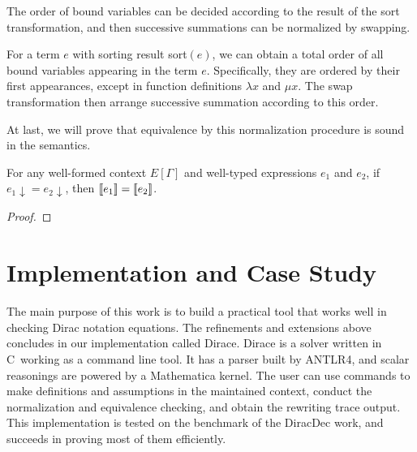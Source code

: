 \documentclass[runningheads]{llncs}
\newcommand{\CC}{C\nolinebreak\hspace{-.05em}\raisebox{.4ex}{\tiny\bf +}\nolinebreak\hspace{-.10em}\raisebox{.4ex}{\tiny\bf +}}
\def\CC{{C\nolinebreak[4]\hspace{-.05em}\raisebox{.4ex}{\tiny\bf ++}}}
\begin{document}
The order of bound variables can be decided according to the result of the sort transformation, and then successive summations can be normalized by swapping.
\begin{definition}
    For a term $e$ with sorting result sort$(e)$, we can obtain a total order of all bound variables appearing in the term $e$. Specifically, they are ordered by their first appearances, except in function definitions $\lambda x$ and $\mu x$.
    The swap transformation then arrange successive summation according to this order.
\end{definition}






At last, we will prove that equivalence by this normalization procedure is sound in the semantics. 

\begin{theorem}[soundness]
    For any well-formed context $E[\Gamma]$ and well-typed expressions $e_1$ and $e_2$, if $e_1\downarrow = e_2\downarrow$, then ${\llbracket e_1 \rrbracket} = {\llbracket e_2 \rrbracket}$.
\end{theorem}
\begin{proof}
    
\end{proof}





\section{Implementation and Case Study}

The main purpose of this work is to build a practical tool that works well in checking Dirac notation equations. The refinements and extensions above concludes in our implementation called Dirace. Dirace is a solver written in \CC\ working as a command line tool. It has a parser built by ANTLR4, and scalar reasonings are powered by a Mathematica kernel. The user can use commands to make definitions and assumptions in the maintained context, conduct the normalization and equivalence checking, and obtain the rewriting trace output. This implementation 
is tested on the benchmark of the DiracDec work, and succeeds in proving most of them efficiently.
\end{document}
